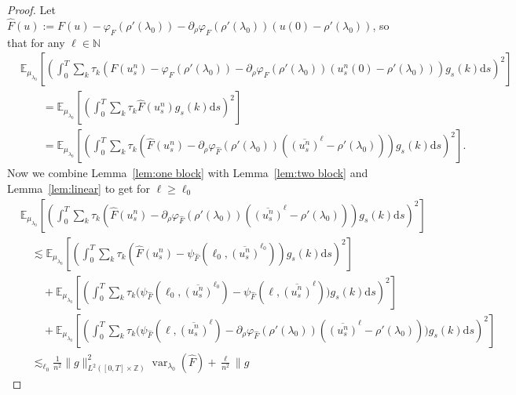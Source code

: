 \documentclass[11pt, a4paper]{article}
\newcommand{\assign}{:=}
\newcommand{\mathd}{\mathrm{d}}
\newcommand{\tmop}[1]{\ensuremath{\operatorname{#1}}}
\newcommand{\1}{\mathbf{1}}
\begin{document}
\begin{proof}
  {\color{black} Let $\hat{F} (u) \assign F (u) - \varphi_F (\rho'
  (\lambda_0)) - \partial_{\rho} \varphi_F (\rho' (\lambda_0)) (u (0) - \rho'
  (\lambda_0))$, so that for any $\ell \in \mathbb{N}$
  \begin{align*}
   &\mathbb{E}_{{\mu}_{\lambda_0}} \left[ \left( \int_0^T \sum_k \tau_k
   \left( F (u^n_s) - \varphi_F (\rho' (\lambda_0)) - \partial_{\rho}
   \varphi_F \left( \rho' (\lambda_0) \right) (u_s^n (0) - \rho'
   (\lambda_0)) \right) g_s (k) \mathd s \right)^2 \right] \\
   &\qquad=\mathbb{E}_{{\mu}_{\lambda_0}} \left[ \left( \int_0^T \sum_k \tau_k
   \hat{F} (u^n_s) g_s (k) \mathd s \right)^2 \right] \\
   &\qquad=\mathbb{E}_{{\mu}_{\lambda_0}} \left[ \left( \int_0^T \sum_k \tau_k
   (\hat{F} (u^n_s) - \partial_{\rho} \varphi_{\hat{F}} (\rho' (\lambda_0))
   (\overline{(u_s^n)}^{\ell} - \rho' (\lambda_0))) g_s (k) \mathd s
   \right)^2 \right].
  \end{align*}
  Now we combine Lemma~\ref{lem:one block} with Lemma~\ref{lem:two block} and
  Lemma~\ref{lem:linear} to get for $\ell \geqslant \ell_0$
  \begin{align*}
   &\mathbb{E}_{{\mu}_{\lambda_0}} \left[ \left( \int_0^T \sum_k \tau_k
   (\hat{F} (u^n_s) - \partial_{\rho} \varphi_{\hat{F}} (\rho' (\lambda_0))
   (\overline{(u_s^n)}^{\ell} - \rho' (\lambda_0))) g_s (k) \mathd s
   \right)^2 \right] \\
   &\quad
   \lesssim \mathbb{E}_{{\mu}_{\lambda_0}} \left[ \left( \int_0^T
   \sum_k \tau_k (\hat{F} (u^n_s) - \psi_{\hat{F}} (\ell_0,
   \overline{(u^n_s)}^{\ell_0})) g_s (k) \mathd s \right)^2 \right] \\
   &\qquad
   +\mathbb{E}_{{\mu}_{\lambda_0}} \left[ \left( \int_0^T \sum_k \tau_k
   \big( \psi_{\hat{F}} (\ell_0, \overline{(u^n_s)}^{\ell_0}) -
   \psi_{\hat{F}} ( \ell, \overline{(u^{n_{}}_s)}^{\ell} )
   \big) g_s (k) \mathd s \right)^2 \right] \\
   &\qquad
   +\mathbb{E}_{{\mu}_{\lambda_0}} \left[ \left( \int_0^T \sum_k \tau_k
   \big( \psi_{\hat{F}} ( \ell, \overline{(u^{n_{}}_s)}^{\ell} )
   - \partial_{\rho} \varphi_{\hat{F}} (\rho' (\lambda_0))
   (\overline{(u_s^n)}^{\ell} - \rho' (\lambda_0)) \big) g_s (k) \mathd s
   \right)^2 \right] \\
   &\quad
   \lesssim_{\ell_0} \frac{1}{n^2} \| g \|_{L^2 ([0, T] \times
   \mathbb{Z})}^2 \tmop{var}_{\lambda_0} (\hat{F}) + \frac{\ell}{n^2} \| g

\end{align*}}
\end{proof}
\end{document}
